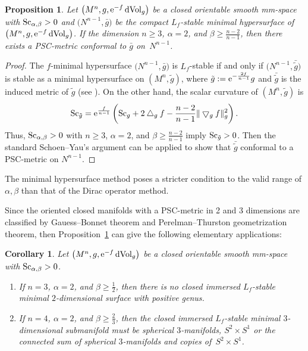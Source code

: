 \documentclass[10pt,a4paper]{amsart}
\newtheorem{Corollary}[Theorem]{Corollary}
\newtheorem{Proposition}[Theorem]{Proposition}
\begin{document}
\begin{Proposition}\label{hypersuface}
Let $\big(M^n, g, {\rm e}^{-f}\,{\rm dVol}_g\big)$ be a closed orientable smooth mm-space with \linebreak \mbox{${\rm Sc}_{\alpha, \beta} > 0$} and $\big(N^{n-1},\bar{g}\big)$ be the compact $L_f$-stable minimal hypersurface of $\big(M^n, g, {\rm e}^{-f}\,{\rm dVol}_g\big)$. If the dimension $n\geq 3$, $\alpha=2$, and $\beta \geq \frac{n-2}{n-1}$, then there exists a PSC-metric conformal to $\bar{g}$ on~$N^{n-1}$.
\end{Proposition}

\begin{proof}The $f$-minimal hypersurface $\big(N^{n-1}, \bar{g}\big)$ is $L_f$-stable if and only if $\big(N^{n-1}, \bar{\tilde{g}}\big)$ is stable as a minimal hypersurface on $(M^n, \tilde{g})$, where $\tilde{g}:={\rm e}^{-\frac{2f}{n-1}}g$ and $ \bar{\tilde{g}}$ is the induced metric of $\tilde{g}$ (see \cite[Appendix]{MR3324919}). On the other hand, the scalar curvature of $(M^n, \tilde{g})$ is
\begin{gather*}
{\rm Sc}_{\tilde{g}}= {\rm e}^{\frac{f}{n-1}}\left({\rm Sc}_g +2\bigtriangleup_gf-\frac{n-2}{n-1}\|\bigtriangledown_gf\|^2_g\right).
\end{gather*}
Thus, ${\rm Sc}_{\alpha, \beta} > 0$ with $n\geq 3$, $\alpha=2$, and $\beta \geq \frac{n-2}{n-1}$ imply ${\rm Sc}_{\tilde{g}}>0$. Then the standard Schoen--Yau's argument can be applied to show that $\bar{\tilde{g}}$ conformal to a PSC-metric on $N^{n-1}$.
\end{proof}

\begin{Remark}The minimal hypersurface method poses a stricter condition to the valid range of $\alpha, \beta$ than that of the Dirac operator method.
\end{Remark}

Since the oriented closed manifolds with a PSC-metric in 2 and 3 dimensions are classified by Gauess--Bonnet theorem and Perelman--Thurston geometrization theorem, then Proposition~\ref{hypersuface} can give the following elementary applications:

\begin{Corollary}\label{minisurface}
Let $\big(M^n, g, {\rm e}^{-f}\,{\rm dVol}_g\big)$ be a closed orientable smooth mm-space with ${\rm Sc}_{\alpha, \beta} > 0$.
\begin{enumerate}\itemsep=0pt
\item[$1.$] If $n=3$, $\alpha=2$, and $\beta \geq \frac{1}{2}$, then there is no closed immersed $L_f$-stable minimal $2$-di\-men\-sional surface with positive genus.
\item[$2.$] If $n=4$, $\alpha=2$, and $\beta \geq \frac{2}{3}$, then the closed immersed $L_f$-stable minimal $3$-dimensional submanifold must be spherical $3$-manifolds, $S^2\times S^1$ or the connected sum of spherical $3$-manifolds and copies of~$S^2\times S^1$.
\end{enumerate}
\end{Corollary}
\end{document}
